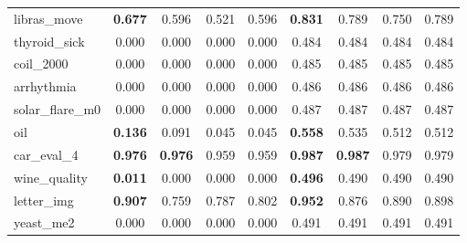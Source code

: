 \begin{figure}[ht]
\begin{tabular}{p{22mm}|*4{p{14mm}}|*4{p{14mm}}}
        libras\_move&\multicolumn{1}{c}{\textbf{0.677}}&\multicolumn{1}{c}{0.596}&\multicolumn{1}{c}{0.521}&\multicolumn{1}{c|}{0.596}&\multicolumn{1}{c}{\textbf{0.831}}&\multicolumn{1}{c}{0.789}&\multicolumn{1}{c}{0.750}&\multicolumn{1}{c}{0.789}\\
        thyroid\_sick&\multicolumn{1}{c}{0.000}&\multicolumn{1}{c}{0.000}&\multicolumn{1}{c}{0.000}&\multicolumn{1}{c|}{0.000}&\multicolumn{1}{c}{0.484}&\multicolumn{1}{c}{0.484}&\multicolumn{1}{c}{0.484}&\multicolumn{1}{c}{0.484}\\
        coil\_2000&\multicolumn{1}{c}{0.000}&\multicolumn{1}{c}{0.000}&\multicolumn{1}{c}{0.000}&\multicolumn{1}{c|}{0.000}&\multicolumn{1}{c}{0.485}&\multicolumn{1}{c}{0.485}&\multicolumn{1}{c}{0.485}&\multicolumn{1}{c}{0.485}\\
        arrhythmia&\multicolumn{1}{c}{0.000}&\multicolumn{1}{c}{0.000}&\multicolumn{1}{c}{0.000}&\multicolumn{1}{c|}{0.000}&\multicolumn{1}{c}{0.486}&\multicolumn{1}{c}{0.486}&\multicolumn{1}{c}{0.486}&\multicolumn{1}{c}{0.486}\\
        solar\_flare\_m0&\multicolumn{1}{c}{0.000}&\multicolumn{1}{c}{0.000}&\multicolumn{1}{c}{0.000}&\multicolumn{1}{c|}{0.000}&\multicolumn{1}{c}{0.487}&\multicolumn{1}{c}{0.487}&\multicolumn{1}{c}{0.487}&\multicolumn{1}{c}{0.487}\\
        oil&\multicolumn{1}{c}{\textbf{0.136}}&\multicolumn{1}{c}{0.091}&\multicolumn{1}{c}{0.045}&\multicolumn{1}{c|}{0.045}&\multicolumn{1}{c}{\textbf{0.558}}&\multicolumn{1}{c}{0.535}&\multicolumn{1}{c}{0.512}&\multicolumn{1}{c}{0.512}\\
        car\_eval\_4&\multicolumn{1}{c}{\textbf{0.976}}&\multicolumn{1}{c}{\textbf{0.976}}&\multicolumn{1}{c}{0.959}&\multicolumn{1}{c|}{0.959}&\multicolumn{1}{c}{\textbf{0.987}}&\multicolumn{1}{c}{\textbf{0.987}}&\multicolumn{1}{c}{0.979}&\multicolumn{1}{c}{0.979}\\
        wine\_quality&\multicolumn{1}{c}{\textbf{0.011}}&\multicolumn{1}{c}{0.000}&\multicolumn{1}{c}{0.000}&\multicolumn{1}{c|}{0.000}&\multicolumn{1}{c}{\textbf{0.496}}&\multicolumn{1}{c}{0.490}&\multicolumn{1}{c}{0.490}&\multicolumn{1}{c}{0.490}\\
        letter\_img&\multicolumn{1}{c}{\textbf{0.907}}&\multicolumn{1}{c}{0.759}&\multicolumn{1}{c}{0.787}&\multicolumn{1}{c|}{0.802}&\multicolumn{1}{c}{\textbf{0.952}}&\multicolumn{1}{c}{0.876}&\multicolumn{1}{c}{0.890}&\multicolumn{1}{c}{0.898}\\
        yeast\_me2&\multicolumn{1}{c}{0.000}&\multicolumn{1}{c}{0.000}&\multicolumn{1}{c}{0.000}&\multicolumn{1}{c|}{0.000}&\multicolumn{1}{c}{0.491}&\multicolumn{1}{c}{0.491}&\multicolumn{1}{c}{0.491}&\multicolumn{1}{c}{0.491}\\

\end{tabular}
\end{figure}
